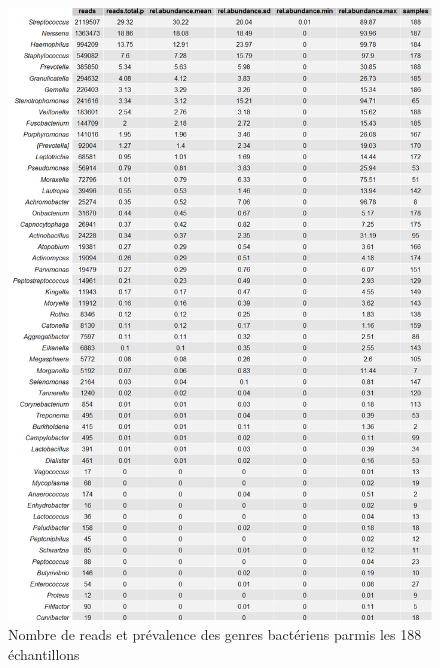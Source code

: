 \documentclass[12pt,a4paper]{article}
\begin{document}
\begin{figure}
\begin{center}
\includegraphics[scale=0.5]{img/all_table.png}\hfill
\end{center}
\caption{Nombre de reads et prévalence des genres bactériens parmis les 188 échantillons}
\label{alltable}
\end{figure}
\end{document}
